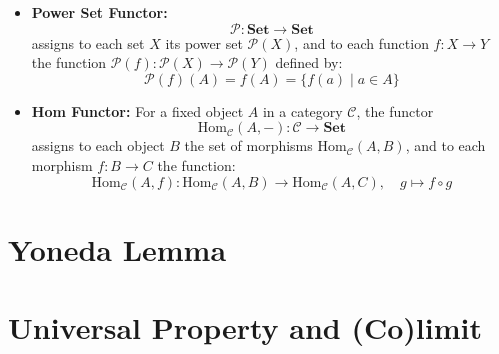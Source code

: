   

\begin{itemize}

    \item \textbf{Power Set Functor:}
    \[
    \mathcal{P}: \mathbf{Set} \to \mathbf{Set}
    \]
    assigns to each set $X$ its power set $\mathcal{P}(X)$, and to each function $f: X \to Y$ the function $\mathcal{P}(f): \mathcal{P}(X) \to \mathcal{P}(Y)$ defined by:
    \[
    \mathcal{P}(f)(A) = f(A) = \{ f(a) \mid a \in A \}
    \]

    \item \textbf{Hom Functor:} For a fixed object $A$ in a category $\mathcal{C}$, the functor
    \[
    \mathrm{Hom}_{\mathcal{C}}(A, -): \mathcal{C} \to \mathbf{Set}
    \]
    assigns to each object $B$ the set of morphisms $\mathrm{Hom}_{\mathcal{C}}(A, B)$, and to each morphism $f: B \to C$ the function:
    \[
    \mathrm{Hom}_{\mathcal{C}}(A, f): \mathrm{Hom}_{\mathcal{C}}(A, B) \to \mathrm{Hom}_{\mathcal{C}}(A, C), \quad g \mapsto f \circ g
    \]
\end{itemize}
\section{Yoneda Lemma}

\section{Universal Property and (Co)limit}
